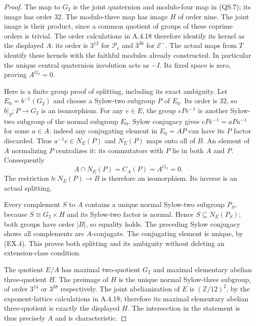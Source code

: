 \begin{proof}
The map to $G_2$ is the joint quaternion and modulo-four
map in (QS.7); its image has order $32$.  The modulo-three
map has image $H$ of order nine.  The joint image is their
product, since a common quotient of groups of these
coprime orders is trivial.  The order calculations in
A.4.18 therefore identify its kernel as the displayed
$A$: its order is $3^{12}$ for $\mathcal P_c$ and $3^{36}$
for $\mathcal E^-$.  The actual maps from $T$ identify
these kernels with the faithful modules already
constructed.  In particular the unique central
quaternion involution acts as $-I$.  Its fixed space
is zero, proving $A^{G_2}=0$.

Here is a finite group proof of splitting, including
its exact ambiguity.  Let $E_0=b^{-1}(G_2)$ and choose
a Sylow-two subgroup $P$ of $E_0$.  Its order is $32$,
so $b|_P:P\to G_2$ is an isomorphism.  For any $e\in E$,
the group $ePe^{-1}$ is another Sylow-two subgroup of
the normal subgroup $E_0$.  Sylow conjugacy gives
$ePe^{-1}=aPa^{-1}$ for some $a\in A$: indeed any
conjugating element in $E_0=AP$ can have its $P$
factor discarded.  Thus $a^{-1}e\in N_E(P)$ and
$N_E(P)$ maps onto all of $B$.
An element of $A$ normalizing $P$ centralizes it:
its commutators with $P$ lie in both $A$ and $P$.
Consequently
\[
 A\cap N_E(P)=C_A(P)=A^{G_2}=0.                         \tag{EX.4}
\]
The restriction $b:N_E(P)\to B$ is therefore an
isomorphism.  Its inverse is an actual splitting.

Every complement $S$ to $A$ contains a unique normal
Sylow-two subgroup $P_S$, because $S\cong G_2\times H$
and its Sylow-two factor is normal.  Hence
$S\subseteq N_E(P_S)$; both groups have order $|B|$,
so equality holds.  The preceding Sylow conjugacy
shows all complements are $A$-conjugate.  The
conjugating element is unique, by (EX.4).  This proves
both splitting and its ambiguity without deleting an
extension-class condition.

The quotient $E/A$ has maximal two-quotient $G_2$ and
maximal elementary abelian three-quotient $H$.
The preimage of $H$ is the unique normal Sylow-three
subgroup, of order $3^{14}$ or $3^{38}$ respectively.
The joint abelianization of $E$ is
$(\mathbb Z/12)^2$, by the exponent-lattice calculations
in A.4.18; therefore its maximal elementary abelian
three-quotient is exactly the displayed $H$.
The intersection in the statement is thus precisely
$A$ and is characteristic.


\end{proof}
